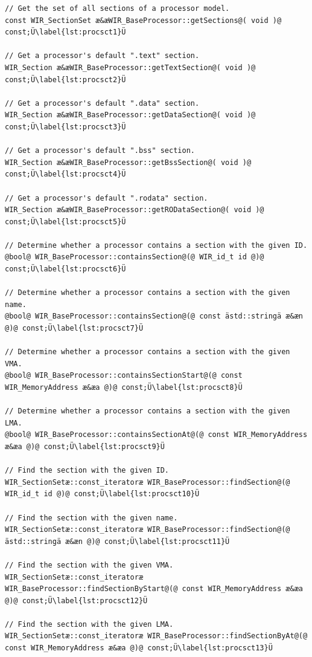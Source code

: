 \begin{lstlisting}[style=code,float=t,caption={Methods for Section Handling of Class \texttt{WIR\_BaseProcessor}},label=lst:procsct]
// Get the set of all sections of a processor model.
const WIR_SectionSet æ&æWIR_BaseProcessor::getSections@( void )@ const;Ü\label{lst:procsct1}Ü

// Get a processor's default ".text" section.
WIR_Section æ&æWIR_BaseProcessor::getTextSection@( void )@ const;Ü\label{lst:procsct2}Ü

// Get a processor's default ".data" section.
WIR_Section æ&æWIR_BaseProcessor::getDataSection@( void )@ const;Ü\label{lst:procsct3}Ü

// Get a processor's default ".bss" section.
WIR_Section æ&æWIR_BaseProcessor::getBssSection@( void )@ const;Ü\label{lst:procsct4}Ü

// Get a processor's default ".rodata" section.
WIR_Section æ&æWIR_BaseProcessor::getRODataSection@( void )@ const;Ü\label{lst:procsct5}Ü

// Determine whether a processor contains a section with the given ID.
@bool@ WIR_BaseProcessor::containsSection@(@ WIR_id_t id @)@ const;Ü\label{lst:procsct6}Ü

// Determine whether a processor contains a section with the given name.
@bool@ WIR_BaseProcessor::containsSection@(@ const ästd::stringä æ&æn @)@ const;Ü\label{lst:procsct7}Ü

// Determine whether a processor contains a section with the given VMA.
@bool@ WIR_BaseProcessor::containsSectionStart@(@ const WIR_MemoryAddress æ&æa @)@ const;Ü\label{lst:procsct8}Ü

// Determine whether a processor contains a section with the given LMA.
@bool@ WIR_BaseProcessor::containsSectionAt@(@ const WIR_MemoryAddress æ&æa @)@ const;Ü\label{lst:procsct9}Ü

// Find the section with the given ID.
WIR_SectionSetæ::const_iteratoræ WIR_BaseProcessor::findSection@(@ WIR_id_t id @)@ const;Ü\label{lst:procsct10}Ü

// Find the section with the given name.
WIR_SectionSetæ::const_iteratoræ WIR_BaseProcessor::findSection@(@ ästd::stringä æ&æn @)@ const;Ü\label{lst:procsct11}Ü

// Find the section with the given VMA.
WIR_SectionSetæ::const_iteratoræ WIR_BaseProcessor::findSectionByStart@(@ const WIR_MemoryAddress æ&æa @)@ const;Ü\label{lst:procsct12}Ü

// Find the section with the given LMA.
WIR_SectionSetæ::const_iteratoræ WIR_BaseProcessor::findSectionByAt@(@ const WIR_MemoryAddress æ&æa @)@ const;Ü\label{lst:procsct13}Ü
\end{lstlisting}

